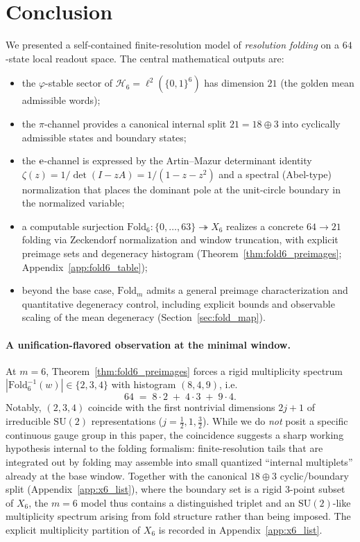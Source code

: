 
\section{Conclusion}
\label{sec:conclusion}

We presented a self-contained finite-resolution model of \emph{resolution folding} on a $64$-state local readout space.
The central mathematical outputs are:
\begin{itemize}
\item the $\varphi$-stable sector of $\mathcal{H}_6=\ell^2(\{0,1\}^6)$ has dimension $21$ (the golden mean admissible words);
\item the $\pi$-channel provides a canonical internal split $21=18\oplus 3$ into cyclically admissible states and boundary states;
\item the $\mathrm{e}$-channel is expressed by the Artin--Mazur determinant identity $\zeta(z)=1/\det(I-zA)=1/(1-z-z^2)$ and a spectral (Abel-type) normalization that places the dominant pole at the unit-circle boundary in the normalized variable;
\item a computable surjection $\mathrm{Fold}_6:\{0,\dots,63\}\twoheadrightarrow X_6$ realizes a concrete $64\to 21$ folding via Zeckendorf normalization and window truncation, with explicit preimage sets and degeneracy histogram (Theorem~\ref{thm:fold6_preimages}; Appendix~\ref{app:fold6_table});
\item beyond the base case, $\mathrm{Fold}_m$ admits a general preimage characterization and quantitative degeneracy control, including explicit bounds and observable scaling of the mean degeneracy (Section~\ref{sec:fold_map}).
\end{itemize}

\paragraph{A unification-flavored observation at the minimal window.}
At $m=6$, Theorem~\ref{thm:fold6_preimages} forces a rigid multiplicity spectrum
\(
|\mathrm{Fold}_6^{-1}(w)|\in\{2,3,4\}
\)
with histogram $(8,4,9)$, i.e.
\[
64 \;=\; 8\cdot 2\;+\;4\cdot 3\;+\;9\cdot 4.
\]
Notably, $(2,3,4)$ coincide with the first nontrivial dimensions $2j+1$ of irreducible $\mathrm{SU}(2)$ representations ($j=\tfrac12,1,\tfrac32$).
While we do \emph{not} posit a specific continuous gauge group in this paper, the coincidence suggests a sharp working hypothesis internal to the folding formalism:
finite-resolution tails that are integrated out by folding may assemble into small quantized ``internal multiplets'' already at the base window.
Together with the canonical $18\oplus 3$ cyclic/boundary split (Appendix~\ref{app:x6_list}), where the boundary set is a rigid 3-point subset of $X_6$, the $m=6$ model thus contains a distinguished triplet and an $\mathrm{SU}(2)$-like multiplicity spectrum arising from fold structure rather than being imposed.
The explicit multiplicity partition of $X_6$ is recorded in Appendix~\ref{app:x6_list}.

